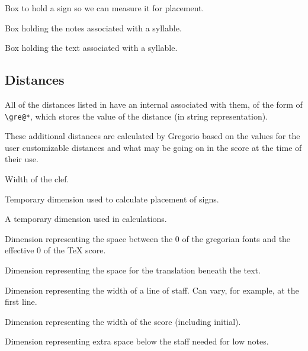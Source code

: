 Box to hold a sign so we can measure it for placement.

Box holding the notes associated with a syllable.

Box holding the text associated with a syllable.



\subsection{Distances}
All of the distances listed in  have an internal
associated with them, of the form of \verb=\gre@*=, which stores the value of the distance (in
string representation).

These additional distances are calculated by Gregorio based on the values for the user customizable distances and what may be going on in the score at the time of their use.

Width of the clef.

Temporary dimension used to calculate placement of signs.

A temporary dimension used in calculations.

Dimension representing the space between the 0 of the gregorian fonts and the effective 0 of the TeX score.

Dimension representing the space for the translation beneath the text.

Dimension representing the width of a line of staff.  Can vary, for
example, at the first line.

Dimension representing the width of the score (including initial).

Dimension representing extra space below the staff needed for low notes.

